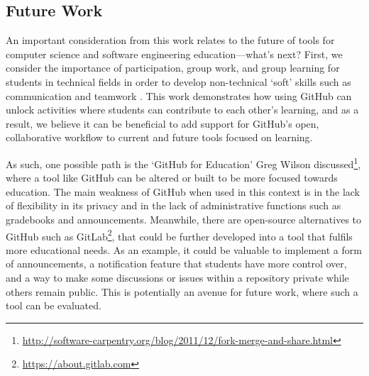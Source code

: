 \subsection{Future Work}
An important consideration from this work relates to the future of tools for computer science and software engineering education---what's next? First, we consider the importance of participation, group work, and group learning for students in technical fields in order to develop non-technical `soft' skills such as communication and teamwork \cite{jazayeri2004education}. This work demonstrates how using GitHub can unlock activities where students can contribute to each other's learning, and as a result, we believe it can be beneficial to add support for GitHub's open, collaborative workflow to current and future tools focused on learning.


As such, one possible path is the `GitHub for Education' Greg Wilson discussed\footnote{\url{http://software-carpentry.org/blog/2011/12/fork-merge-and-share.html}}, where a tool like GitHub can be altered or built to be more focused towards education. The main weakness of GitHub when used in this context is in the lack of flexibility in its privacy and in the lack of administrative functions such as gradebooks and announcements. Meanwhile, there are open-source alternatives to GitHub such as GitLab\footnote{\url{https://about.gitlab.com}}, that could be further developed into a tool that fulfils more educational needs. As an example, it could be valuable to implement a form of announcements, a notification feature that students have more control over, and a way to make some discussions or issues within a repository private while others remain public. This is potentially an avenue for future work, where such a tool can be evaluated.


